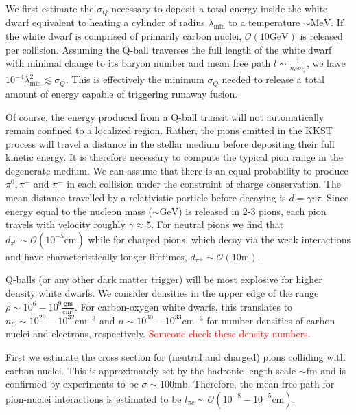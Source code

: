 \documentclass[11 pt, preprint,preprintnumbers,amsmath,amssymb, prd]{revtex4}
\begin{document}
We first estimate the $\sigma_Q$ necessary to deposit a total energy inside the white dwarf equivalent to heating a cylinder of radius $\lambda_{\text{min}}$ to a temperature $\sim \text{MeV}$. If the white dwarf is comprised of primarily carbon nuclei, $\mathcal{O}(10 \text{GeV})$ is released per collision. Assuming the Q-ball traverses the full length of the white dwarf with minimal change to its baryon number and mean free path $l \sim \frac{1}{n_C \sigma_Q}$, we have $10^{-4}\lambda_{\text{min}}^2 \lesssim \sigma_Q$. This is effectively the minimum $\sigma_Q$ needed to release a total amount of energy capable of triggering runaway fusion. 

Of course, the energy produced from a Q-ball transit will not automatically remain confined to a localized region. Rather, the pions emitted in the KKST process will travel a distance in the stellar medium before depositing their full kinetic energy. It is therefore necessary to compute the typical pion range in the degenerate medium. We can assume that there is an equal probability to produce $\pi^0, \pi^+$ and $\pi^-$ in each collision under the constraint of charge conservation. The mean distance travelled by a relativistic particle before decaying is $d = \gamma v \tau$. Since energy equal to the nucleon mass ($\sim \text{GeV}$) is released in 2-3 pions, each pion travels with velocity roughly $\gamma \approx 5$. For neutral pions we find that $d_{\pi^0} \sim \mathcal{O}(10^{-5} \text{cm})$ while for charged pions, which decay via the weak interactions and have characteristically longer lifetimes, $d_{\pi^\pm} \sim \mathcal{O}(10 \text{m})$. 

Q-balls (or any other dark matter trigger) will be most explosive for higher density white dwarfs. We consider densities in the upper edge of the range $\rho \sim 10^{6} - 10^{9} \frac{\text{gm}}{\text{cm}^3}$. For carbon-oxygen white dwarfs, this translates to $n_C \sim 10^{29} - 10^{32} \text{cm}^{-3}$ and $n \sim 10^{30} - 10^{33} \text{cm}^{-3}$ for number densities of carbon nuclei and electrons, respectively. \textcolor{red}{Someone check these density numbers.}

First we estimate the cross section for (neutral and charged) pions colliding with carbon nuclei. This is approximately set by the hadronic length scale $\sim \text{fm}$ and is confirmed by experiments to be $\sigma \sim 100 \text{mb} $. Therefore, the mean free path for pion-nuclei interactions is estimated to be $l_{\pi c} \sim \mathcal{O}(10^{-8} - 10^{-5} \text{cm})$. 
\end{document}
